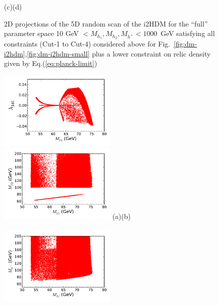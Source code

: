 \begin{figure}[htb]
\vskip -1.0cm
\hspace*{1cm}(c)\hspace*{0.55\textwidth}\hspace*{-1.5cm}(d)
\caption{2D projections of the 5D random scan of the i2HDM for
 the ``full'' parameter space 10 GeV $< M_{h_1}, M_{h_2}, M_{h^{+}} < 1000$~GeV
satisfying all constraints (Cut-1 to Cut-4) considered above for Fig.~\ref{fig:dm-i2hdm},\ref{fig:dm-i2hdm-small}
plus a lower constraint on relic density given by  Eq.(\ref{eq:planck-limit})}
\label{fig:dm-i2hdm-relic}
\end{figure}
%
\begin{figure}[htb]
\hspace*{-0.2cm}\includegraphics[width=0.50\textwidth]{Figures/Mh1_ld345_Omega_zoom-cut123456789_zz-monoc.pdf}%
\hspace*{-0.2cm}\includegraphics[width=0.50\textwidth]{Figures/Mh1_Mh2_Omega_zoom-cut123456789_zz-monoc.pdf}
\vskip -0.8cm
\hspace*{1cm}(a)\hspace*{0.55\textwidth}\hspace*{-1.5cm}(b)
\\
\\
\hspace*{-0.2cm}\includegraphics[width=0.50\textwidth]{Figures/Mh1_Mhc_Omega_zoom-cut123456789_zz-monoc.pdf}%

\end{figure}
